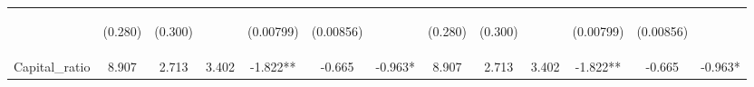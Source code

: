 \documentclass[]{article}
\begin{document}
\begin{center}
\begin{tabular}{lcccccccccccc}
\vspace{4pt} & \begin{footnotesize}(0.280)\end{footnotesize} & \begin{footnotesize}(0.300)\end{footnotesize} & \begin{footnotesize}\end{footnotesize} & \begin{footnotesize}(0.00799)\end{footnotesize} & \begin{footnotesize}(0.00856)\end{footnotesize} & \begin{footnotesize}\end{footnotesize} & \begin{footnotesize}(0.280)\end{footnotesize} & \begin{footnotesize}(0.300)\end{footnotesize} & \begin{footnotesize}\end{footnotesize} & \begin{footnotesize}(0.00799)\end{footnotesize} & \begin{footnotesize}(0.00856)\end{footnotesize} & \begin{footnotesize}\end{footnotesize} \\
Capital\_ratio & 8.907 & 2.713 & 3.402 & -1.822** & -0.665 & -0.963* & 8.907 & 2.713 & 3.402 & -1.822** & -0.665 & -0.963* \\

\end{tabular}
\end{center}
\end{document}
